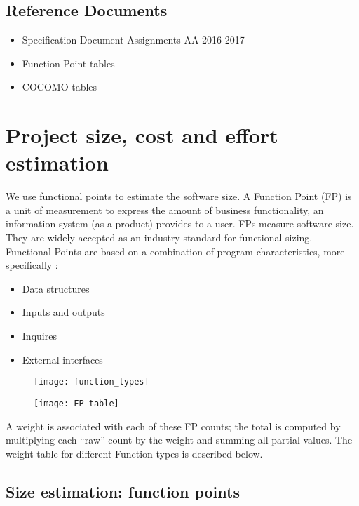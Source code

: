 \documentclass{article}
\begin{document}
\subsection{Reference Documents}
\begin{itemize}
	\item Specification Document Assignments AA 2016-2017
	\item Function Point tables
	\item COCOMO tables
\end{itemize}
\newpage

\section{Project size, cost and effort estimation}
We use functional points to estimate the software size. A Function Point (FP) is a unit of measurement to express the amount of business functionality, an information system (as a product) provides to a user. FPs measure software size. They are widely accepted as an industry standard for functional sizing.\\
Functional Points are based on a combination of program characteristics, more specifically :
\begin{itemize}
	\item Data structures
	\item Inputs and outputs
	\item Inquires
	\item External interfaces
\end{itemize}
	\begin{figure}[h]
	\texttt{[image: function\_types]}
\end{figure}
\begin{figure}[h!]
	\texttt{[image: FP\_table]}
\end{figure}
A weight is associated with each of these FP counts; the total is computed by multiplying each “raw” count by the weight and summing all partial values. The weight table for different Function types is described below.
\newpage
\subsection{Size estimation: function points}
\end{document}
